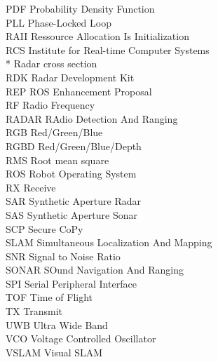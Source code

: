 \begin{listofabbrevs}
\begin{tabbing}
PDF \> Probability Density Function \\
PLL \> Phase-Locked Loop \\
RAII \> Ressource Allocation Is Initialization \\
RCS \> Institute for Real-time Computer Systems \\*
   	\> Radar cross section \\
RDK \> Radar Development Kit \\
REP \> ROS Enhancement Proposal \\
RF \> Radio Frequency \\
RADAR \> RAdio Detection And Ranging \\
RGB \> Red/Green/Blue \\
RGBD \> Red/Green/Blue/Depth \\
RMS \> Root mean square \\
ROS \> Robot Operating System \\
RX \> Receive \\
SAR \> Synthetic Aperture Radar \\
SAS \> Synthetic Aperture Sonar \\
SCP \> Secure CoPy \\
SLAM \> Simultaneous Localization And Mapping \\
SNR \> Signal to Noise Ratio \\
SONAR \> SOund Navigation And Ranging \\
SPI \> Serial Peripheral Interface \\
TOF \> Time of Flight \\
TX \> Transmit \\
UWB \> Ultra Wide Band \\
VCO \> Voltage Controlled Oscillator \\
VSLAM \> Visual SLAM \\

\end{tabbing}
\end{listofabbrevs}
